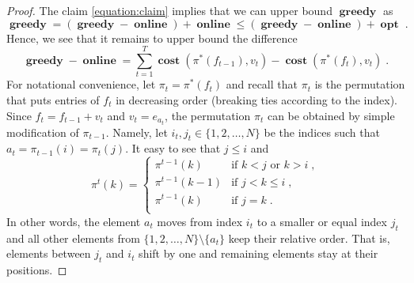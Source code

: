 \documentclass[12pt]{article}
\DeclareMathOperator{\cost}{\mathbf{cost}}
\DeclareMathOperator{\greedy}{\mathbf{greedy}}
\DeclareMathOperator{\online}{\mathbf{online}}
\DeclareMathOperator{\opt}{\mathbf{opt}}
\begin{document}
\begin{proof}
The claim \eqref{equation:claim} implies that we can upper bound $\greedy$ as
$$
\greedy
= (\greedy - \online) + \online
\le (\greedy - \online) + \opt \; .
$$
Hence, we see that it remains to upper bound the difference
$$
\greedy - \online = \sum_{t=1}^T \cost(\pi^*(f_{t-1}), v_t) - \cost(\pi^*(f_t), v_t) \; .
$$
For notational convenience, let $\pi_t = \pi^*(f_t)$ and recall that $\pi_t$ is
the permutation that puts entries of $f_t$ in decreasing order (breaking ties
according to the index). Since $f_t = f_{t-1} + v_t$ and $v_t = e_{a_t}$, the
permutation $\pi_t$ can be obtained by simple modification of $\pi_{t-1}$.
Namely, let $i_t, j_t \in \{1,2,\dots,N\}$ be the indices such that $a_t =
\pi_{t-1}(i) = \pi_t(j)$. It easy to see that $j \le i$ and
$$
\pi^t(k) =
\begin{cases}
\pi^{t-1}(k) & \text{if $k < j$ or $k > i$} \; ,  \\
\pi^{t-1}(k-1) & \text{if $j < k \le i$} \; , \\
\pi^{t-1}(k) & \text{if $j = k$} \; . \\
\end{cases}
$$
In other words, the element $a_t$ moves from index $i_t$ to a smaller or equal
index $j_t$ and all other elements from $\{1,2,\dots,N\} \setminus \{a_t\}$ keep
their relative order. That is, elements between $j_t$ and $i_t$ shift by one and
remaining elements stay at their positions.


\end{proof}
\end{document}

